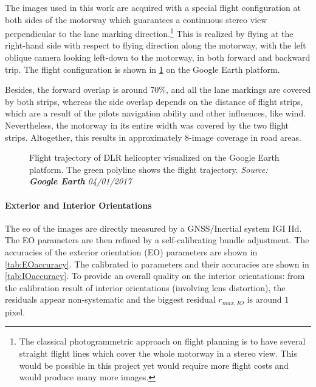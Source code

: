 The images used in this work are acquired with a special flight configuration at both sides of the motorway which guarantees a continuous stereo view perpendicular to the lane marking direction.\footnote{The classical photogrammetric approach on flight planning is to have several straight flight lines which cover the whole motorway in a stereo view. This would be possible in this project yet would require more flight costs and would produce many more images.} This is realized by flying at the right-hand side with respect to flying direction along the motorway, with the left oblique camera looking left-down to the motorway, in both forward and backward trip. The flight configuration is shown in \cref{fig:FlightTrajectory} on the Google Earth platform.

Besides, the forward overlap is around 70\%, and all the lane markings are covered by both strips, whereas the side overlap depends on the distance of flight strips, which are a result of the pilots navigation ability and other influences, like wind. Nevertheless, the motorway in its entire width was covered by the two flight strips. Altogether, this results in approximately 8-image coverage in road areas. 

\begin{figure}%
  \centering
  \caption{\small Flight trajectory of DLR helicopter visualized on the Google Earth platform. The green polyline shows the flight trajectory. \textit{Source: \textbf{Google Earth} 04/01/2017}}
  \label{fig:FlightTrajectory}
\end{figure}


\paragraph{Exterior and Interior Orientations}
The \gls{eo} of the images are directly measured by a GNSS/Inertial system IGI IId.%
The EO parameters are then refined by a self-calibrating bundle adjustment. The accuracies of the exterior orientation (EO) parameters are shown in \cref{tab:EOaccuracy}. The calibrated \gls{io} parameters and their accuracies are shown in \cref{tab:IOaccuracy}. To provide an overall quality on the interior orientations: from the calibration result of interior orientations (involving lens distortion), the residuals appear non-systematic and the biggest residual $r_{max, IO}$ is around $1$ pixel.

